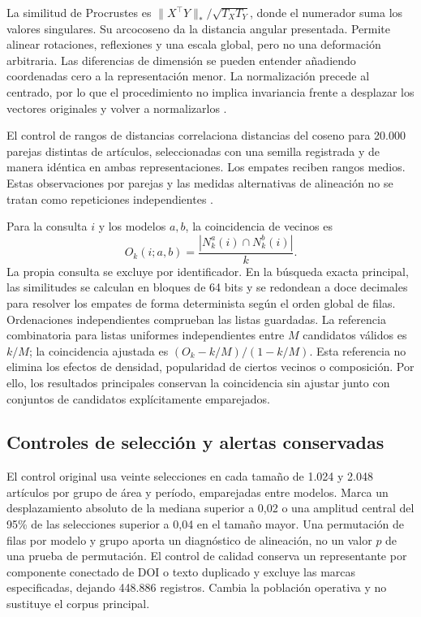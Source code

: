\documentclass[12pt]{article}
\begin{document}
La similitud de Procrustes es $\lVert X^\top Y\rVert_*/\sqrt{T_XT_Y}$, donde el numerador suma los valores singulares. Su arcocoseno da la distancia angular presentada. Permite alinear rotaciones, reflexiones y una escala global, pero no una deformación arbitraria. Las diferencias de dimensión se pueden entender añadiendo coordenadas cero a la representación menor. La normalización precede al centrado, por lo que el procedimiento no implica invariancia frente a desplazar los vectores originales y volver a normalizarlos \citep{NEURIPS2021_252a3dba}.

El control de rangos de distancias correlaciona distancias del coseno para 20.000 parejas distintas de artículos, seleccionadas con una semilla registrada y de manera idéntica en ambas representaciones. Los empates reciben rangos medios. Estas observaciones por parejas y las medidas alternativas de alineación no se tratan como repeticiones independientes \citep{pmlr-v285-williams24a}.

Para la consulta $i$ y los modelos $a,b$, la coincidencia de vecinos es
\[
O_k(i;a,b)=\frac{|N_k^a(i)\cap N_k^b(i)|}{k}.
\]
La propia consulta se excluye por identificador. En la búsqueda exacta principal, las similitudes se calculan en bloques de 64 bits y se redondean a doce decimales para resolver los empates de forma determinista según el orden global de filas. Ordenaciones independientes comprueban las listas guardadas. La referencia combinatoria para listas uniformes independientes entre $M$ candidatos válidos es $k/M$; la coincidencia ajustada es $(O_k-k/M)/(1-k/M)$. Esta referencia no elimina los efectos de densidad, popularidad de ciertos vecinos o composición. Por ello, los resultados principales conservan la coincidencia sin ajustar junto con conjuntos de candidatos explícitamente emparejados.

\subsection{Controles de selección y alertas conservadas}
El control original usa veinte selecciones en cada tamaño de 1.024 y 2.048 artículos por grupo de área y período, emparejadas entre modelos. Marca un desplazamiento absoluto de la mediana superior a 0,02 o una amplitud central del 95\% de las selecciones superior a 0,04 en el tamaño mayor. Una permutación de filas por modelo y grupo aporta un diagnóstico de alineación, no un valor $p$ de una prueba de permutación. El control de calidad conserva un representante por componente conectado de DOI o texto duplicado y excluye las marcas especificadas, dejando 448.886 registros. Cambia la población operativa y no sustituye el corpus principal.
\end{document}
